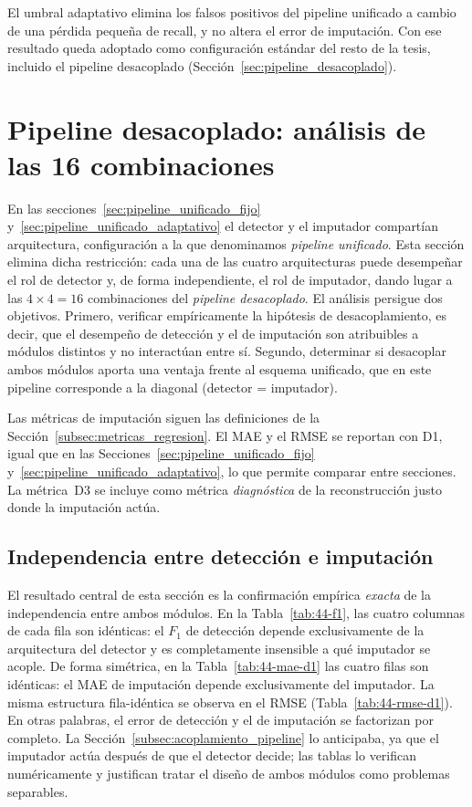 \documentclass{report}
\begin{document}
El umbral adaptativo elimina los falsos positivos del pipeline unificado a cambio de una pérdida pequeña de recall, y no altera el error de imputación. Con ese resultado queda adoptado como configuración estándar del resto de la tesis, incluido el pipeline desacoplado (Sección~\ref{sec:pipeline_desacoplado}).

\section{Pipeline desacoplado: análisis de las 16 combinaciones}
\label{sec:pipeline-desacoplado}

En las secciones~\ref{sec:pipeline_unificado_fijo} y~\ref{sec:pipeline_unificado_adaptativo} el detector y el imputador compartían arquitectura, configuración a la que denominamos \emph{pipeline unificado}. Esta sección elimina dicha restricción: cada una de las cuatro arquitecturas puede desempeñar el rol de detector y, de forma independiente, el rol de imputador, dando lugar a las $4\times 4 = 16$ combinaciones del \emph{pipeline desacoplado}. El análisis persigue dos objetivos. Primero, verificar empíricamente la hipótesis de desacoplamiento, es decir, que el desempeño de detección y el de imputación son atribuibles a módulos distintos y no interactúan entre sí. Segundo, determinar si desacoplar ambos módulos aporta una ventaja frente al esquema unificado, que en este pipeline corresponde a la diagonal (detector = imputador).

Las métricas de imputación siguen las definiciones de la Sección~\ref{subsec:metricas_regresion}. El MAE y el RMSE se reportan con D1, igual que en las Secciones~\ref{sec:pipeline_unificado_fijo} y~\ref{sec:pipeline_unificado_adaptativo}, lo que permite comparar entre secciones. La métrica~D3 se incluye como métrica \emph{diagnóstica} de la reconstrucción justo donde la imputación actúa.


\subsection{Independencia entre detección e imputación}
\label{subsec:independencia}

El resultado central de esta sección es la confirmación empírica \emph{exacta} de la independencia entre ambos módulos. En la Tabla~\ref{tab:44-f1}, las cuatro columnas de cada fila son idénticas: el $F_1$ de detección depende exclusivamente de la arquitectura del detector y es completamente insensible a qué imputador se acople. De forma simétrica, en la Tabla~\ref{tab:44-mae-d1} las cuatro filas son idénticas: el MAE de imputación depende exclusivamente del imputador. La misma estructura fila-idéntica se observa en el RMSE (Tabla~\ref{tab:44-rmse-d1}). En otras palabras, el error de detección y el de imputación se factorizan por completo. La Sección~\ref{subsec:acoplamiento_pipeline} lo anticipaba, ya que el imputador actúa después de que el detector decide; las tablas lo verifican numéricamente y justifican tratar el diseño de ambos módulos como problemas separables.
\end{document}
